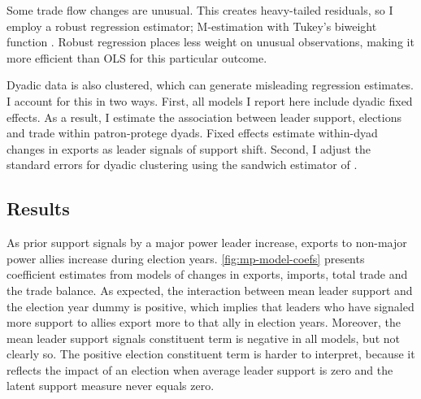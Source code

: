 \documentclass[12pt]{article}
\begin{document}
Some trade flow changes are unusual. 
This creates heavy-tailed residuals, so I employ a robust regression estimator; M-estimation with Tukey's biweight function \citep{RaineyBaissa2020}.
Robust regression places less weight on unusual observations, making it more efficient than OLS for this particular outcome.


Dyadic data is also clustered, which can generate misleading regression estimates.
I account for this in two ways. 
First, all models I report here include dyadic fixed effects.
As a result, I estimate the association between leader support, elections and trade within patron-protege dyads. 
Fixed effects estimate within-dyad changes in exports as leader signals of support shift.
Second, I adjust the standard errors for dyadic clustering using the sandwich estimator of \citep{Aronowetal2015}.




\subsection{Results}


As prior support signals by a major power leader increase, exports to non-major power allies increase during election years. 
\autoref{fig:mp-model-coefs} presents coefficient estimates from models of changes in exports, imports, total trade and the trade balance. 
As expected, the interaction between mean leader support and the election year dummy is positive, which implies that leaders who have signaled more support to allies export more to that ally in election years. 
Moreover, the mean leader support signals constituent term is negative in all models, but not clearly so. 
The positive election constituent term is harder to interpret, because it reflects the impact of an election when average leader support is zero and the latent support measure never equals zero. 
\end{document}
